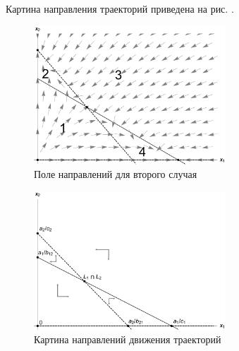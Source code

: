 \documentclass[12pt,a4paper]{article}
\begin{document}
    Картина направления траекторий приведена на рис. .




    \pagebreak
    
    \begin{figure}[h]
        \centering
        \includegraphics[width=0.64\textwidth]{areas_2.pdf}
        \caption{Поле направлений для второго случая}
        \label{fig:areas_2}
    \end{figure}
    

    \begin{figure}[h]
        \centering
        \includegraphics[width=0.64\textwidth]{areas_2*.pdf}
        \caption{Картина направлений движения траекторий}
        \label{fig:areas_2*}
    \end{figure}
\end{document}
